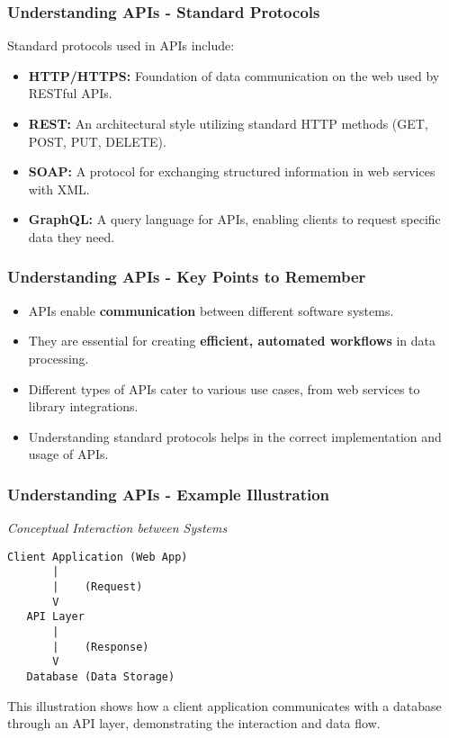 \documentclass[aspectratio=169]{beamer}
\begin{document}
\begin{frame}[fragile]
    \frametitle{Understanding APIs - Standard Protocols}
    Standard protocols used in APIs include:
    \begin{itemize}
        \item \textbf{HTTP/HTTPS:} Foundation of data communication on the web used by RESTful APIs.
        \item \textbf{REST:} An architectural style utilizing standard HTTP methods (GET, POST, PUT, DELETE).
        \item \textbf{SOAP:} A protocol for exchanging structured information in web services with XML.
        \item \textbf{GraphQL:} A query language for APIs, enabling clients to request specific data they need.
    \end{itemize}
\end{frame}

\begin{frame}[fragile]
    \frametitle{Understanding APIs - Key Points to Remember}
    \begin{itemize}
        \item APIs enable \textbf{communication} between different software systems.
        \item They are essential for creating \textbf{efficient, automated workflows} in data processing.
        \item Different types of APIs cater to various use cases, from web services to library integrations.
        \item Understanding standard protocols helps in the correct implementation and usage of APIs.
    \end{itemize}
\end{frame}

\begin{frame}[fragile]
    \frametitle{Understanding APIs - Example Illustration}
    \begin{center}
        \textit{Conceptual Interaction between Systems}
        \begin{verbatim}
Client Application (Web App)
       |
       |    (Request)
       V
   API Layer
       |
       |    (Response)
       V
   Database (Data Storage)
        \end{verbatim}
    \end{center}
    This illustration shows how a client application communicates with a database through an API layer, demonstrating the interaction and data flow.
\end{frame}
\end{document}
